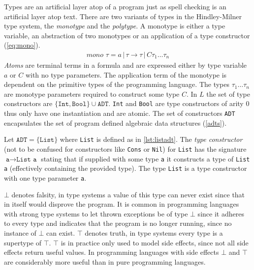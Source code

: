 \documentclass[11pt,oneside,a4paper]{report}
\begin{document}
Types are an artificial layer atop of a program just as spell checking is an artificial layer atop text.
There are two variants of types in the Hindley-Milner type system, the \textit{monotype} and the \textit{polytype}.
A monotype is either a type variable, an abstraction of two monotypes or an application of a type constructor (\autoref{eq:mono}).
\begin{align}
	mono \,\,\tau = a \,|\, \tau \rightarrow \tau \,|\, C \tau_1 \dots \tau_n
	\label{eq:mono}
\end{align}
\textit{Atoms} are terminal terms in a formula and are expressed either by type variable $a$ or $C$ with no type parameters.
The application term of the monotype is dependent on the primitive types of the programming language.
The types $\tau_1 \dots \tau_n$ are monotype parameters required to construct some type $C$.
In $L$ the set of type constructors are $\{ \texttt{Int}, \texttt{Bool} \} \cup \texttt{ADT}$.
\texttt{Int} and \texttt{Bool} are type constructors of arity 0 thus only have one instantiation and are atomic.
The set of constructors \texttt{ADT} encapsulates the set of program defined algebraic data structures (\autoref{adts}).
\begin{exmp}
    Let $\texttt{ADT} = \{ \texttt{List} \}$ where \texttt{List} is defined as in \autoref{lst:listadt}.
    The \textit{type constructor} (not to be confused for constructors like \texttt{Cons} or \texttt{Nil}) for \texttt{List} has the signature $\texttt{a} \rightarrow \texttt{List a}$ stating that if supplied with some type \texttt{a} it constructs a type of \texttt{List a} (effectively containing the provided type).
    The type \texttt{List} is a type constructor with one type parameter \texttt{a}.
\end{exmp}

$\bot$ denotes falsity, in type systems a value of this type can never exist since that in itself would disprove the program.
It is common in programming languages with strong type systems to let thrown exceptions be of type $\bot$ since it adheres to every type and indicates that the program is no longer running, since no instance of $\bot$ can exist.
$\top$ denotes truth, in type systems every type is a supertype of $\top$.
$\top$ is in practice only used to model side effects, since not all side effects return useful values.
In programming languages with side effects $\bot$ and $\top$ are considerably more useful than in pure programming languages.
\end{document}
